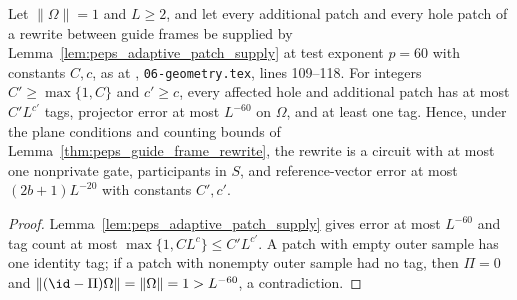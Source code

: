 \begin{lemma}
    \label{lem:peps_guide_frame_patch_data}
    \leanok
    Let $\lVert\Omega\rVert=1$ and $L\ge2$, and let every additional patch and
    every hole patch of a rewrite between guide frames be supplied by Lemma~\ref{lem:peps_adaptive_patch_supply} at test exponent $p=60$ with constants
    $C,c$, as at \cite[Section~7]{OpenAI2026PolynomialPEPS},
    \texttt{06-geometry.tex}, lines 109--118. For integers $C'\ge\max\{1,C\}$ and
    $c'\ge c$, every affected hole and additional
    patch has at most $C'L^{c'}$ tags, projector error at most $L^{-60}$ on $\Omega$, and at least one tag. Hence, under the plane
    conditions and counting bounds of
    Lemma~\ref{thm:peps_guide_frame_rewrite}, the rewrite is a circuit with
    at most one nonprivate gate, participants in $S$, and reference-vector error at most $(2b+1)L^{-20}$ with constants $C',c'$.
\end{lemma}

\begin{proof}\leanok
    Lemma~\ref{lem:peps_adaptive_patch_supply} gives error at most $L^{-60}$ and tag count at most $\max\{1,CL^c\}\le C'L^{c'}$. A patch with empty outer sample has one identity tag; if a patch with nonempty outer sample had no
    tag, then $\Pi=0$ and $\lVert(\id-\Pi)\Omega\rVert=\lVert\Omega\rVert=1>L^{-60}$, a contradiction.
\end{proof}

